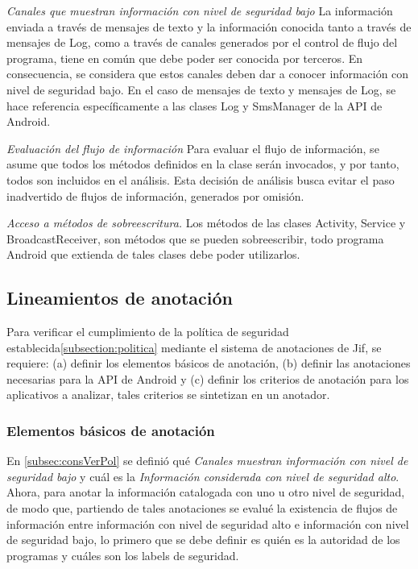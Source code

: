 \textit{Canales que muestran información con nivel de seguridad bajo}\newline
La información enviada a través de mensajes de texto y la información conocida
tanto a través de mensajes de Log, como a través de canales generados por el
control de flujo del programa, tiene en común que debe poder ser conocida por
terceros. En consecuencia, se considera que estos canales deben dar a conocer
información con nivel de seguridad bajo.\newline
En el caso de mensajes de texto y mensajes de Log, se hace referencia
específicamente a las clases Log y SmsManager de la API de Android.

\textit{Evaluación del flujo de información}\newline
Para evaluar el flujo de información, se asume que todos los métodos definidos
en la clase serán invocados, y por tanto, todos son incluidos en el análisis.\newline 
Esta decisión de análisis busca evitar el paso inadvertido de flujos de
información, generados por omisión.

\textit{Acceso a métodos de sobreescritura.}\newline
Los métodos de las clases Activity, Service y BroadcastReceiver, son métodos
que se pueden sobreescribir, todo programa Android que extienda de tales clases
debe poder utilizarlos.

\subsection{Lineamientos de anotación}
\label{subsec:linemientos}
Para verificar el cumplimiento de la política de seguridad
establecida\ref{subsection:politica} mediante el sistema de anotaciones de Jif,
se requiere: (a) definir los elementos básicos de anotación, (b) definir
las anotaciones necesarias para la API de Android y (c) definir los
criterios de anotación para los aplicativos a analizar, tales 
criterios se sintetizan en un anotador.

\subsubsection{Elementos básicos de anotación}
En \ref{subsec:consVerPol} se definió qué \textit{Canales muestran
información con nivel de seguridad bajo} y cuál es la \textit{Información
considerada con nivel de seguridad alto}. Ahora, para anotar la información
catalogada con uno u otro nivel de seguridad, de modo que, partiendo de tales
anotaciones se evalué la existencia de flujos de información entre información
con nivel de seguridad alto e información con nivel de seguridad bajo, lo primero
que se debe definir es quién es la autoridad de los programas y cuáles son los
labels de seguridad.

